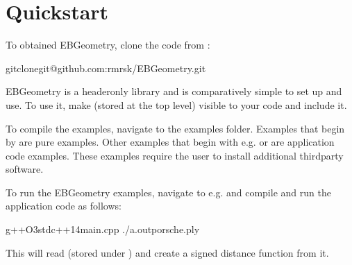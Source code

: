 \documentclass[letterpaper,10pt,english]{sphinxmanual}
\begin{document}
\section{Quickstart}
\label{\detokenize{Introduction:quickstart}}
\sphinxAtStartPar
To obtained EBGeometry, clone the code from :

\begin{sphinxVerbatim}[commandchars=\\\{\}]
gitclonegit@github.com:rmrsk/EBGeometry.git
\end{sphinxVerbatim}

\sphinxAtStartPar
EBGeometry is a header\sphinxhyphen{}only library and is comparatively simple to set up and use.
To use it, make  (stored at the top level) visible to your code and include it.

\sphinxAtStartPar
To compile the examples, navigate to the examples folder.
Examples that begin by  are pure  examples.
Other examples that begin with e.g.  or  are application code examples.
These examples require the user to install additional third\sphinxhyphen{}party software.

\sphinxAtStartPar
To run the EBGeometry examples, navigate to e.g.  and compile and run the application code as follows:

\begin{sphinxVerbatim}[commandchars=\\\{\}]
g++\PYGZhy{}O3\PYGZhy{}stdc++14main.cpp
./a.outporsche.ply
\end{sphinxVerbatim}

\sphinxAtStartPar
This will read  (stored under ) and create a signed distance function from it.
\end{document}
